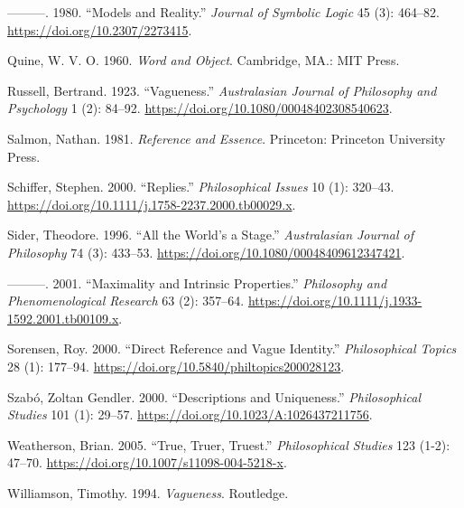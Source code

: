 \documentclass[
  11pt,
  letterpaper,
  DIV=11,
  numbers=noendperiod,
  oneside]{scrartcl}
\newlength{\cslhangindent}
\newenvironment{CSLReferences}[2] %
 {\begin{list}{}{%
  \setlength{\itemindent}{0pt}
  \setlength{\leftmargin}{0pt}
  \setlength{\parsep}{0pt}
  \ifodd #1
   \setlength{\leftmargin}{\cslhangindent}
   \setlength{\itemindent}{-1\cslhangindent}
  \fi
  \setlength{\itemsep}{#2\baselineskip}}}
 {\end{list}}
\begin{document}
\begin{CSLReferences}{1}{0}
---------. 1980. {``Models and Reality.''} \emph{Journal of Symbolic
Logic} 45 (3): 464--82. \url{https://doi.org/10.2307/2273415}.

Quine, W. V. O. 1960. \emph{Word and Object}. Cambridge, MA.: MIT Press.

Russell, Bertrand. 1923. {``Vagueness.''} \emph{Australasian Journal of
Philosophy and Psychology} 1 (2): 84--92.
\url{https://doi.org/10.1080/00048402308540623}.

Salmon, Nathan. 1981. \emph{Reference and Essence}. Princeton: Princeton
University Press.

Schiffer, Stephen. 2000. {``Replies.''} \emph{Philosophical Issues} 10
(1): 320--43. \url{https://doi.org/10.1111/j.1758-2237.2000.tb00029.x}.

Sider, Theodore. 1996. {``All the World's a Stage.''} \emph{Australasian
Journal of Philosophy} 74 (3): 433--53.
\url{https://doi.org/10.1080/00048409612347421}.

---------. 2001. {``Maximality and Intrinsic Properties.''}
\emph{Philosophy and Phenomenological Research} 63 (2): 357--64.
\url{https://doi.org/10.1111/j.1933-1592.2001.tb00109.x}.

Sorensen, Roy. 2000. {``Direct Reference and Vague Identity.''}
\emph{Philosophical Topics} 28 (1): 177--94.
\url{https://doi.org/10.5840/philtopics200028123}.

Szabó, Zoltan Gendler. 2000. {``Descriptions and Uniqueness.''}
\emph{Philosophical Studies} 101 (1): 29--57.
\url{https://doi.org/10.1023/A:1026437211756}.

Weatherson, Brian. 2005. {``{True, Truer, Truest}.''}
\emph{Philosophical Studies} 123 (1-2): 47--70.
\url{https://doi.org/10.1007/s11098-004-5218-x}.

Williamson, Timothy. 1994. \emph{{Vagueness}}. Routledge.

\end{CSLReferences}
\end{document}
